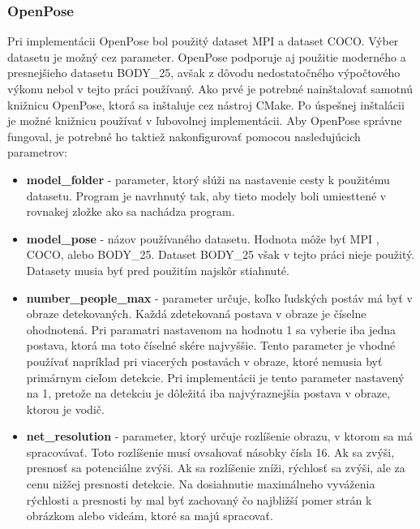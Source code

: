 \documentclass[slovak,master,dept460,male,cpp,cpdeclaration]{diploma}
\begin{document}
\subsubsection*{OpenPose}
 Pri implementácii OpenPose bol použitý dataset MPI a dataset COCO. Výber datasetu je možný cez parameter. OpenPose podporuje aj použitie moderného a presnejšieho datasetu BODY\_25, avšak z dôvodu nedostatočného výpočtového výkonu nebol v tejto práci používaný. Ako prvé je potrebné nainštalovať samotnú knižnicu OpenPose, ktorá sa inštaluje cez  nástroj CMake. Po úspešnej inštalácii je možné  knižnicu používať v ľubovolnej  implementácii. Aby OpenPose správne fungoval, je potrebné ho taktiež nakonfigurovať pomocou nasledujúcich parametrov:
 \begin{itemize}
\item \textbf{model\_folder} - parameter, ktorý slúži na nastavenie cesty k použitému  datasetu. Program je navrhnutý tak, aby  tieto modely boli umiesttené v rovnakej zložke ako sa nachádza program. 
\item \textbf{model\_pose} - názov používaného datasetu. Hodnota môže  byť MPI , COCO, alebo BODY\_25. Dataset  BODY\_25 však v tejto práci nieje použitý. Datasety musia byť pred použitím najskôr stiahnuté.
\item \textbf{number\_people\_max} - parameter určuje, koľko ľudských postáv má byť v obraze detekovaných. Každá zdetekovaná postava v obraze je číselne ohodnotená. Pri paramatri nastavenom na hodnotu 1 sa vyberie iba jedna postava, ktorá ma toto číselné skére najvyššie. Tento parameter je vhodné používať napríklad pri viacerých postavách v obraze, ktoré nemusia byť primárnym cieľom detekcie. Pri implementácii je tento parameter nastavený na 1, pretože na detekciu je dôležitá iba najvýraznejšia postava v obraze, ktorou je vodič.
\item \textbf{net\_resolution} - parameter, ktorý určuje rozlíšenie  obrazu, v ktorom sa má spracovávať. Toto rozlíšenie  musí ovsahovať násobky čísla 16. Ak sa zvýši, presnosť sa potenciálne zvýši. Ak sa rozlíšenie zníži, rýchlosť sa zvýši, ale za cenu nižšej presnosti detekcie.  Na dosiahnutie maximálneho vyváženia rýchlosti a presnosti by mal byť zachovaný čo najbližší pomer strán k obrázkom alebo videám, ktoré sa majú spracovať.
\end{itemize}
\end{document}
